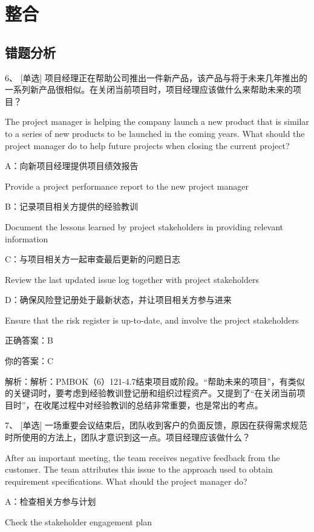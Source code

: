 
\chapter{整合}

\section{错题分析}

6、 [单选] 项目经理正在帮助公司推出一件新产品，该产品与将于未来几年推出的一系列新产品很相似。在关闭当前项目时，项目经理应该做什么来帮助未来的项目？

The project manager is helping the company launch a new product that is similar to a series of new products to be launched in the coming years. What should the project manager do to help future projects when closing the current project?

A：向新项目经理提供项目绩效报告

Provide a project performance report to the new project manager

B：记录项目相关方提供的经验教训

Document the lessons learned by project stakeholders in providing relevant information

C：与项目相关方一起审查最后更新的问题日志

Review the last updated issue log together with project stakeholders

D：确保风险登记册处于最新状态，并让项目相关方参与进来

Ensure that the risk register is up-to-date, and involve the project stakeholders

正确答案：B

你的答案：C

解析：解析：PMBOK（6）121-4.7结束项目或阶段。“帮助未来的项目”，有类似的关键词时，要考虑到经验教训登记册和组织过程资产。又提到了“在关闭当前项目时”，在收尾过程中对经验教训的总结非常重要，也是常出的考点。

7、 [单选] 一场重要会议结束后，团队收到客户的负面反馈，原因在获得需求规范时所使用的方法上，团队才意识到这一点。项目经理应该做什么？

After an important meeting, the team receives negative feedback from the customer. The team attributes this issue to the approach used to obtain requirement specifications. What should the project manager do?

A：检查相关方参与计划

Check the stakeholder engagement plan

